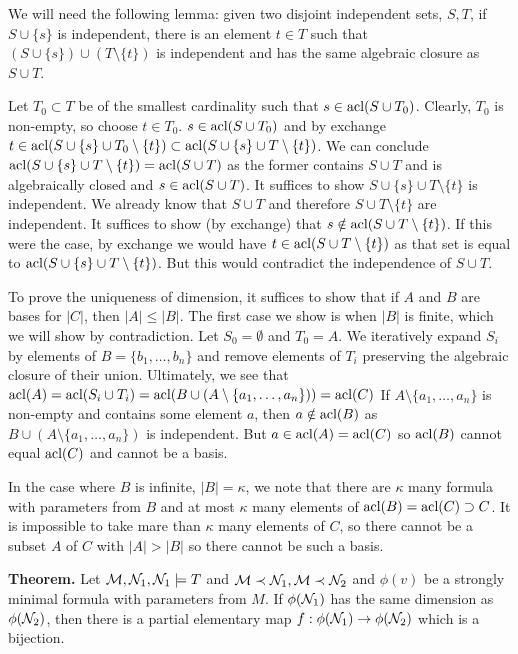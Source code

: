 We will need the following lemma: given two disjoint independent sets, \(S, T\), if \(S \cup \{s\}\) is independent, there is an element \(t \in T\) such that \((S \cup \{s\}) \cup (T \setminus \{t\})\) is independent and has the same algebraic closure as \(S \cup T\). 

Let \(T_0 \subset T\) be of the smallest cardinality such that \(s \in \text{acl}(S \cup T_0)\). 
Clearly, \(T_0\) is non-empty, so choose \(t \in T_0\). 
\(s \in \text{acl}(S \cup T_0)\) and by exchange \(t \in \text{acl}(S \cup \{s\} \cup T_0 \setminus \{t\}) \subset \text{acl}(S \cup \{s\} \cup T \setminus \{t\})\).
We can conclude \(\text{acl}(S \cup \{s\} \cup T \setminus \{t\}) = \text{acl}(S \cup T)\) as the former contains \(S \cup T\) and is algebraically closed and \(s \in \text{acl}(S \cup T)\). 
It suffices to show \(S \cup \{s\} \cup T \setminus \{t\}\) is independent. 
We already know that \(S \cup T\) and therefore \(S \cup T \setminus \{t\}\) are independent. 
It suffices to show (by exchange) that \(s \notin \text{acl}(S \cup T \setminus \{t\})\).
If this were the case, by exchange we would have \(t \in \text{acl}(S \cup T \setminus \{t\})\) as that set is equal to \(\text{acl}(S \cup \{s\} \cup T \setminus\{t\})\).
But this would contradict the independence of \(S \cup T\). 

To prove the uniqueness of dimension, it suffices to show that if \(A\) and \(B\) are bases for \(|C|\), then \(|A| \leq |B|\). 
The first case we show is when \(|B|\) is finite, which we will show by contradiction.  
Let \(S_0 = \emptyset\) and \(T_0 = A\). We iteratively expand \(S_i\) by elements of \(B = \{b_1, \ldots, b_n\}\) and remove elements of \(T_i\) preserving the algebraic closure of their union. 
Ultimately, we see that \(\text{acl}(A) = \text{acl}(S_i \cup T_i) = \text{acl}(B \cup (A \setminus \{a_1, \ldots, a_n\})) = \text{acl}(C)\)
If \(A \setminus \{a_1, \ldots, a_n\}\) is non-empty and contains some element \(a\), then \(a \notin \text{acl}(B)\) as \(B \cup (A \setminus \{a_1, \ldots, a_n\})\) is independent. 
But \(a \in \text{acl}(A) = \text{acl}(C)\) so \(\text{acl}(B)\) cannot equal \(\text{acl}(C)\) and cannot be a basis. 

In the case where \(B\) is infinite, \(|B| = \kappa\), we note that there are \(\kappa\) many formula with parameters from \(B\) and at most \(\kappa\) many elements of \(\text{acl}(B) = \text{acl}(C) \supset C\). 
It is impossible to take mare than \(\kappa\) many elements of \(C\), so there cannot be a subset \(A\) of \(C\) with \(|A| > |B|\) so there cannot be such a basis. 

\textbf{Theorem.} Let \(\mathcal{M}, \mathcal{N}_1, \mathcal{N}_1 \models T\) and \(\mathcal{M} \prec \mathcal{N}_1, \mathcal{M} \prec \mathcal{N}_2\) and \(\phi(v)\) be a strongly minimal formula with parameters from \(M\).
If \(\phi(\mathcal{N}_1)\) has the same dimension as \(\phi(\mathcal{N}_2)\), then there is a partial elementary map \(f: \phi(\mathcal{N}_1) \to \phi(\mathcal{N}_2)\) which is a bijection. 

